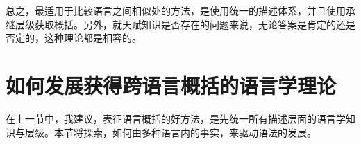 总之，最适用于比较语言之间相似处的方法，是使用统一的描述体系，并且使用承继层级获取概括。另外，就天赋知识是否存在的问题来说，无论答案是肯定的还是否定的，这种理论都是相容的。

\section{如何发展获得跨语言概括的语言学理论}
\label{sec-develop-theories-coregram}

在上一节中，我建议，表征语言概括的好方法，是先统一所有描述层面的语言学知识与层级。本节将探索，如何由多种语言内的事实，来驱动语法的发展。

